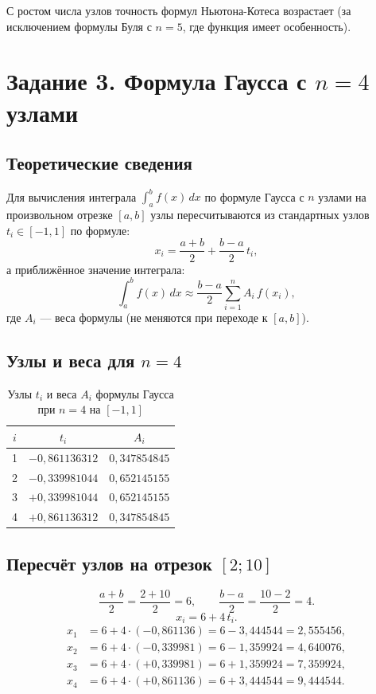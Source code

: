 \documentclass[a4paper, final]{article}
\begin{document}
С ростом числа узлов точность формул Ньютона-Котеса возрастает (за исключением формулы Буля с $n=5$, где функция имеет особенность).

\newpage

\section{Задание 3. Формула Гаусса с $n = 4$ узлами}

\subsection{Теоретические сведения}

Для вычисления интеграла $\displaystyle\int_a^b f(x)\,dx$ по формуле Гаусса с $n$
узлами на произвольном отрезке $[a,b]$ узлы пересчитываются из стандартных
узлов $t_i \in [-1,1]$ по формуле:
\[
x_i = \frac{a+b}{2} + \frac{b-a}{2}\,t_i,
\]
а приближённое значение интеграла:
\[
\int_a^b f(x)\,dx \approx \frac{b-a}{2}\sum_{i=1}^{n} A_i\,f(x_i),
\]
где $A_i$ --- веса формулы (не меняются при переходе к $[a,b]$).

\subsection{Узлы и веса для $n = 4$}

\begin{table}[h!]
\centering
\caption{Узлы $t_i$ и веса $A_i$ формулы Гаусса при $n=4$ на $[-1,1]$}
\label{tab:gauss_tab}
\begin{tabular}{|c|c|c|}
\hline
$i$ & $t_i$ & $A_i$ \\
\hline
1 & $-0{,}861136312$ & $0{,}347854845$ \\
2 & $-0{,}339981044$ & $0{,}652145155$ \\
3 & $+0{,}339981044$ & $0{,}652145155$ \\
4 & $+0{,}861136312$ & $0{,}347854845$ \\
\hline
\end{tabular}
\end{table}

\subsection{Пересчёт узлов на отрезок $[2; 10]$}

\[
\frac{a+b}{2} = \frac{2+10}{2} = 6, \qquad
\frac{b-a}{2} = \frac{10-2}{2} = 4.
\]
\[
x_i = 6 + 4\,t_i.
\]
\begin{align*}
x_1 &= 6 + 4\cdot(-0{,}861136) = 6 - 3{,}444544 = 2{,}555456,\\
x_2 &= 6 + 4\cdot(-0{,}339981) = 6 - 1{,}359924 = 4{,}640076,\\
x_3 &= 6 + 4\cdot(+0{,}339981) = 6 + 1{,}359924 = 7{,}359924,\\
x_4 &= 6 + 4\cdot(+0{,}861136) = 6 + 3{,}444544 = 9{,}444544.
\end{align*}
\end{document}
